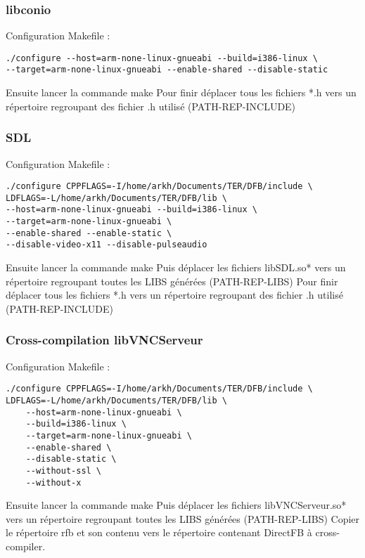 \subsubsection{libconio}
Configuration Makefile :

\begin{lstlisting}
./configure --host=arm-none-linux-gnueabi --build=i386-linux \
--target=arm-none-linux-gnueabi --enable-shared --disable-static
\end{lstlisting}
Ensuite lancer la commande make
Pour finir déplacer tous les fichiers *.h vers un répertoire regroupant des fichier .h utilisé (PATH-REP-INCLUDE)

\subsubsection{SDL}
Configuration Makefile :

\begin{lstlisting}
./configure CPPFLAGS=-I/home/arkh/Documents/TER/DFB/include \ 
LDFLAGS=-L/home/arkh/Documents/TER/DFB/lib \
--host=arm-none-linux-gnueabi --build=i386-linux \ 
--target=arm-none-linux-gnueabi \
--enable-shared --enable-static \
--disable-video-x11 --disable-pulseaudio
\end{lstlisting}

Ensuite lancer la commande make
Puis déplacer les fichiers libSDL.so* vers un répertoire regroupant toutes les LIBS générées (PATH-REP-LIBS)
Pour finir déplacer tous les fichiers *.h vers un répertoire regroupant des fichier .h utilisé (PATH-REP-INCLUDE)

\subsubsection{Cross-compilation libVNCServeur}

Configuration Makefile :

\begin{lstlisting}
./configure CPPFLAGS=-I/home/arkh/Documents/TER/DFB/include \
LDFLAGS=-L/home/arkh/Documents/TER/DFB/lib \  
	--host=arm-none-linux-gnueabi \
	--build=i386-linux \
	--target=arm-none-linux-gnueabi \ 
	--enable-shared \
	--disable-static \
	--without-ssl \
	--without-x
\end{lstlisting}

Ensuite lancer la commande make
Puis déplacer les fichiers libVNCServeur.so* vers un répertoire regroupant toutes les LIBS générées (PATH-REP-LIBS)
Copier le répertoire rfb et son contenu vers le répertoire contenant DirectFB à cross-compiler.

